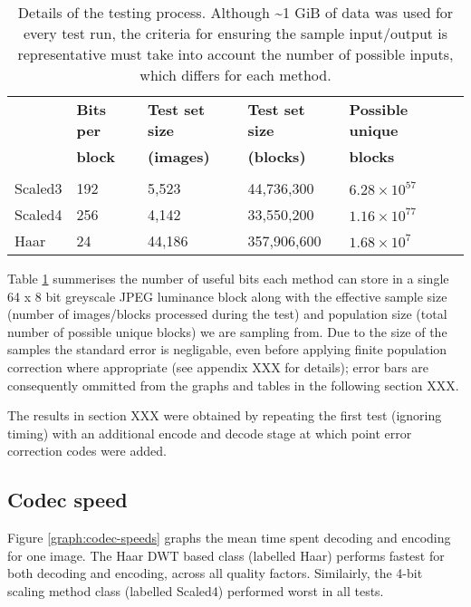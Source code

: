 \begin{table}[tbp]
  \begin{center}
        \begin{tabular}{l l l l l}
        &\textbf{Bits per} &\textbf{Test set size} & \textbf{Test set size} &\textbf{Possible unique} \\ 
            &\textbf{block} &\textbf{(images)} &\textbf{(blocks)} &\textbf{blocks} \\ [0.1ex] \hline \\ [-1.5ex]
        Scaled3	&192	&5,523	&44,736,300	& $6.28 \times 10^{57}$ \\
        Scaled4	&256	&4,142	&33,550,200	& $1.16 \times 10^{77}$ \\
        Haar	&24	&44,186	&357,906,600	& $1.68 \times 10^{7}$ \\
        \end{tabular}
        \caption{Details of the testing process. Although \textasciitilde 1 GiB of data was used for every test run, the criteria for ensuring the sample input/output is representative must take into account the number of possible inputs, which differs for each method.}
        \label{tab:img-test}
    \end{center}
\end{table}


Table \ref{tab:img-test} summerises the number of useful bits each method can store in a single 64 x 8 bit greyscale JPEG luminance block along with the effective sample size (number of images/blocks processed during the test) and population size (total number of possible unique blocks) we are sampling from. Due to the size of the samples the standard error is negligable, even before applying finite population correction where appropriate (see appendix XXX for details); error bars are consequently ommitted from the graphs and tables in the following section XXX.

The results in section XXX were obtained by repeating the first test (ignoring timing) with an additional encode and decode stage at which point error correction codes were added.

\subsection{Codec speed}

Figure \ref{graph:codec-speeds} graphs the mean time spent decoding and encoding for one image. The Haar DWT based class (labelled Haar) performs fastest for both decoding and encoding, across all quality factors. Similairly, the 4-bit scaling method class (labelled Scaled4) performed worst in all tests. 

